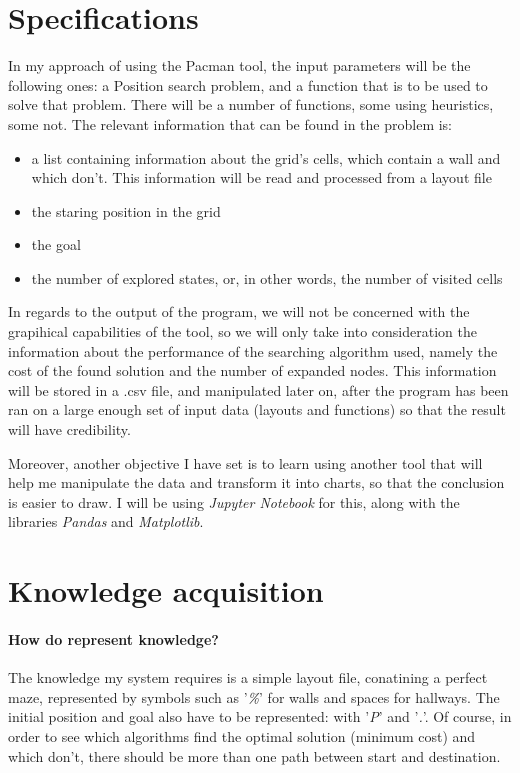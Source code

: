 \documentclass[a4paper,12pt]{report}
\begin{document}
\section{Specifications}
In my approach of using the Pacman tool, the input parameters will be the following ones: a Position search problem, and a function that is to be used to solve that problem. There will be a number of functions, some using heuristics, some not. The relevant information that can be found in the problem is:
\begin{itemize}
	\item a list containing information about the grid's cells, which contain a wall and which don't. This information will be read and processed from a layout file
	\item the staring position in the grid
	\item the goal
	\item the number of explored states, or, in other words, the number of visited cells
\end{itemize}

In regards to the output of the program, we will not be concerned with the grapihical capabilities of the tool, so we will only take into consideration the information about the performance of the searching algorithm used, namely the cost of the found solution and the number of expanded nodes. This information will be stored in a .csv file, and manipulated later on, after the program has been ran on a large enough set of input data (layouts and functions) so that the result will have credibility. 

Moreover, another objective I have set is to learn using another tool that will help me manipulate the data and transform it into charts, so that the conclusion is easier to draw. I will be using \textit{Jupyter Notebook} for this, along with the libraries \textit{Pandas} and \textit{Matplotlib}.


\section{Knowledge acquisition}

\paragraph{How do represent knowledge?} 

The knowledge my system requires is a simple layout file, conatining a perfect maze, represented by symbols such as '\textit{\%}' for walls and spaces for hallways. The initial position and goal also have to be represented: with '\textit{P}' and '\textit{.}'. Of course, in order to see which algorithms find the optimal solution (minimum cost) and which don't, there should be more than one path between start and destination.
\end{document}
